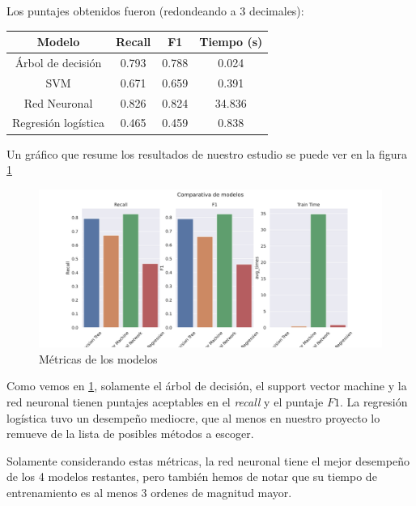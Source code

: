 \documentclass[journal]{IEEEtran}                                                          %
\begin{document}
        Los puntajes obtenidos fueron (redondeando a 3 decimales):
        
        \begin{center}
            \begin{tabular}{ |c|c|c|c| }
                \hline
                Modelo & Recall & F1 & Tiempo (s) \\
                \hline
                Árbol de decisión & 0.793 & 0.788 & 0.024 \\
                \hline
                SVM & 0.671 & 0.659 & 0.391 \\
                \hline
                Red Neuronal & 0.826 & 0.824 & 34.836 \\
                \hline
                Regresión logística & 0.465 & 0.459 & 0.838 \\
                \hline
            \end{tabular}
        \end{center}

        Un gráfico que resume los resultados de nuestro estudio se puede ver en la figura \ref{comparison}

        \begin{figure}[!htb]
            \centering
            \includegraphics[scale=0.26]{../report/img/comparison-results.pdf}
            \caption{Métricas de los modelos}
            \label{comparison}
        \end{figure}

        Como vemos en \ref{comparison}, solamente el árbol de decisión, el support vector machine y la red neuronal tienen puntajes aceptables en el \emph{recall} y el puntaje $F1$. La regresión logística tuvo un desempeño mediocre, que al menos en nuestro proyecto lo remueve de la lista de posibles métodos a escoger.

        Solamente considerando estas métricas, la red neuronal tiene el mejor desempeño de los 4 modelos restantes, pero también hemos de notar que su tiempo de entrenamiento es al menos 3 ordenes de magnitud mayor.
\end{document}
